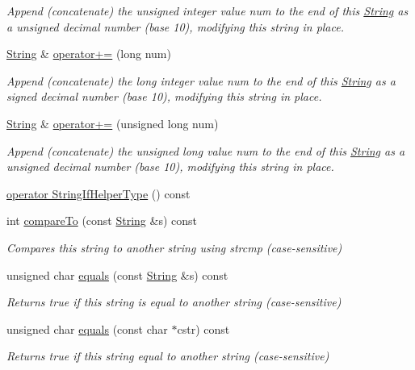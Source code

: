 \begin{DoxyCompactItemize}
\begin{DoxyCompactList}\small\item\em Append (concatenate) the unsigned integer value num to the end of this \hyperlink{class_string}{String} as a unsigned decimal number (base 10), modifying this string in place. \end{DoxyCompactList}\item 
\hyperlink{class_string}{String} \& \hyperlink{class_string_a2638de5d162cb9395bd2837458cef124}{operator+=} (long num)
\begin{DoxyCompactList}\small\item\em Append (concatenate) the long integer value num to the end of this \hyperlink{class_string}{String} as a signed decimal number (base 10), modifying this string in place. \end{DoxyCompactList}\item 
\hyperlink{class_string}{String} \& \hyperlink{class_string_aeaf915e3c8fa71652b2fae59f201a5a2}{operator+=} (unsigned long num)
\begin{DoxyCompactList}\small\item\em Append (concatenate) the unsigned long value num to the end of this \hyperlink{class_string}{String} as a unsigned decimal number (base 10), modifying this string in place. \end{DoxyCompactList}\item 
\hyperlink{class_string_aa15ca61ec96c4068e07c23fea25625fa}{operator String\+If\+Helper\+Type} () const
\item 
int \hyperlink{class_string_ab95c64acc3d5105efdc9709a4cc31e76}{compare\+To} (const \hyperlink{class_string}{String} \&s) const
\begin{DoxyCompactList}\small\item\em Compares this string to another string using strcmp (case-\/sensitive) \end{DoxyCompactList}\item 
unsigned char \hyperlink{class_string_a1f8b83b7dfd47de4062abc3d57e4c351}{equals} (const \hyperlink{class_string}{String} \&s) const
\begin{DoxyCompactList}\small\item\em Returns true if this string is equal to another string (case-\/sensitive) \end{DoxyCompactList}\item 
unsigned char \hyperlink{class_string_add7c8de5fdbebf0fba593d97535228c2}{equals} (const char $\ast$cstr) const
\begin{DoxyCompactList}\small\item\em Returns true if this string equal to another string (case-\/sensitive) \end{DoxyCompactList}\item 

\end{DoxyCompactItemize}
